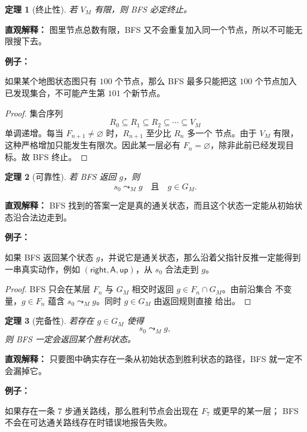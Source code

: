 \documentclass[UTF8]{ctexart}
\theoremstyle{nesylinkblock}
\newtheorem{theorem}{定理}
\newenvironment{examplebox}
  {\begin{center}\begin{lrbox}{\exampleboxcontent}\begin{minipage}{0.92\linewidth}
   \textbf{例子：}\par\smallskip}
  {\end{minipage}\end{lrbox}\fbox{\usebox{\exampleboxcontent}}\end{center}}
\begin{document}
\begin{theorem}[终止性]
若 $V_M$ 有限，则 BFS 必定终止。
\end{theorem}

\noindent\textbf{直观解释：}
图里节点总数有限，BFS 又不会重复加入同一个节点，所以不可能无限搜下去。

\begin{examplebox}
如果某个地图状态图只有 $100$ 个节点，那么 BFS 最多只能把这 $100$ 个节点加入
已发现集合，不可能产生第 $101$ 个新节点。
\end{examplebox}

\begin{proof}
集合序列
\[
  R_0\subseteq R_1\subseteq R_2\subseteq\cdots\subseteq V_M
\]
单调递增。每当 $F_{n+1}\ne\varnothing$ 时，$R_{n+1}$ 至少比 $R_n$ 多一个
节点。由于 $V_M$ 有限，这种严格增加只能发生有限次。因此某一层必有
$F_n=\varnothing$，除非此前已经发现目标。故 BFS 终止。
\end{proof}

\begin{theorem}[可靠性]
若 BFS 返回 $g$，则
\[
  s_0\leadsto_M g
  \quad\text{且}\quad
  g\in G_M.
\]
\end{theorem}

\noindent\textbf{直观解释：}
BFS 找到的答案一定是真的通关状态，而且这个状态一定能从初始状态沿合法边走到。

\begin{examplebox}
如果 BFS 返回某个状态 $g$，并说它是通关状态，那么沿着父指针反推一定能得到
一串真实动作，例如 $(\mathsf{right},\mathsf{A},\mathsf{up})$，从 $s_0$
合法走到 $g$。
\end{examplebox}

\begin{proof}
BFS 只会在某层 $F_n$ 与 $G_M$ 相交时返回 $g\in F_n\cap G_M$。由前沿集合
不变量，$g\in F_n$ 蕴含 $s_0\leadsto_M g$。同时 $g\in G_M$ 由返回规则直接
给出。
\end{proof}

\begin{theorem}[完备性]
若存在 $g\in G_M$ 使得
\[
  s_0\leadsto_M g,
\]
则 BFS 一定会返回某个胜利状态。
\end{theorem}

\noindent\textbf{直观解释：}
只要图中确实存在一条从初始状态到胜利状态的路径，BFS 就一定不会漏掉它。

\begin{examplebox}
如果存在一条 $7$ 步通关路线，那么胜利节点会出现在 $F_7$ 或更早的某一层；
BFS 不会在可达通关路线存在时错误地报告失败。
\end{examplebox}
\end{document}
